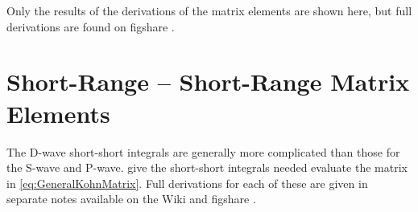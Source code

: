 \documentclass[Dissertation.tex]{subfiles}
\begin{document}
Only the results of the derivations of the matrix elements are shown here, but
full derivations are found on figshare \cite{figshare}.



\section{Short-Range -- Short-Range Matrix Elements}
\label{sec:DWaveShortShort}

The D-wave short-short integrals are generally more complicated than those 
for the S-wave and P-wave.
give the short-short integrals needed evaluate the 
matrix in \cref{eq:GeneralKohnMatrix}. Full derivations for each of these are 
given in separate notes available on the Wiki \cite{Wiki} and figshare
\cite{figshare}.
\end{document}
